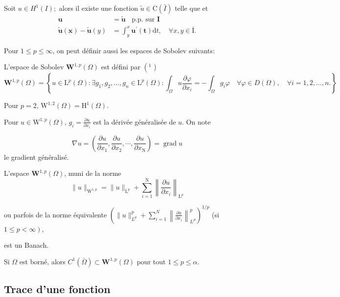 \begin{theorem}
	
 Soit $u \in H^{1}(I) ;$ alors il existe une fonction $\tilde{u} \in \mathrm{C}(\bar{I})$ telle que et
$$
\begin{aligned}
	\boldsymbol{u} &=\tilde{\boldsymbol{u}}\;\;  \text { p.p. sur } \mathbf{I} \\
	\tilde{\boldsymbol{u}}(\boldsymbol{x})-\tilde{\boldsymbol{u}}(y) &=\int_{y}^{x} \boldsymbol{u}^{\prime}(\boldsymbol{t}) \mathrm{d} t,     \quad \forall x, y \in \overline{\mathrm{I}}.
\end{aligned}
$$

\end{theorem}


Pour $1 \leqslant p \leqslant \infty$,  on peut définir aussi les espaces de Sobolev suivants:


L'espace de Sobolev $\mathbf{W}^{1, p}(\Omega)$ est défini par $\left({ }^{1}\right.$ )
$$
\mathbf{W}^{1, p}(\Omega)=
\left\{u \in \mathrm{L}^{p}(\Omega) : 
	\exists  g_{1}, g_{2}, \dots, g_n\in \mathrm{L}^{p}(\Omega) :
	\int_{\Omega}u \frac{\partial \varphi}{\partial x_i}=-\int_{\Omega} g_{i} \varphi \quad \forall \varphi \in D(\Omega),  \quad \forall i=1,2, \dots,n. 
\right\}
$$

Pour $p=2$, 
$\mathrm{W}^{1,2}(\Omega)= \mathrm{H}^{1}(\Omega)$. 

Pour $u\in \mathrm{W}^{1,p}(\Omega)$, $ g_{i}=\frac{\partial u}{\partial x_{i}}$ est la dérivée généralisée de $u$.  On note 

$$
 \nabla u=\left(\frac{\partial u}{\partial x_{1}}, \frac{\partial u}{\partial x_{2}}, \cdots, \frac{\partial u}{\partial x_{\mathrm{N}}}\right)=\operatorname{grad} u
$$
le gradient généralisé. 

L'espace $\mathbf{W}^{1, p}(\Omega)$,  muni de la norme
$$
\|u\|_{\mathrm{W}^{1, p}}=\|u\|_{\mathrm{L}^p}+\sum_{i=1}^{\mathrm{N}}\left\|\frac{\partial u}{\partial x_{i}}\right\|_{\mathrm{L}^p}
$$

ou parfois de la norme équivalente $\left(\|u\|_{L^{p}}^{p}+\displaystyle \sum_{i=1}^{N}\left\|\frac{\partial u}{\partial x_{i}}\right\|_{L^{P}}^{p}\right)^{1 / p}$ (si $\left.1 \leqslant p<\infty\right)$,

est un Banach. 

Si  $\Omega$ est borné, alors  $C^{1}(\bar{\Omega}) \subset \mathbf{W}^{1, p}(\Omega)$  pour tout  $1 \leqslant p \leqslant \alpha$.


\subsection{Trace d'une fonction}

